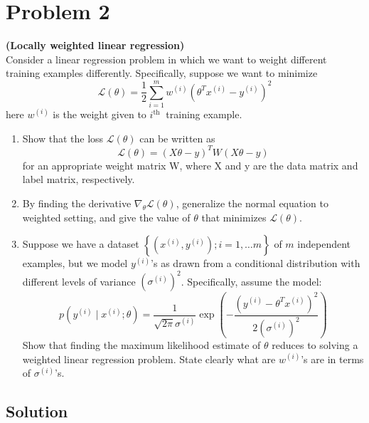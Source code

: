 \section*{Problem 2}

\textbf{(Locally weighted linear regression)}\\
Consider a linear regression problem in which we want to weight different training examples differently.
Specifically, suppose we want to minimize
\begin{equation*}
    \mathcal{L}(\theta)=\frac{1}{2} \sum_{i=1}^{m} w^{(i)}{\left(\theta^{T} x^{(i)}-y^{(i)}\right)}^{2}
\end{equation*}
here \( w^{(i)} \) is the weight given to \( i^{\text {th }} \) training example.

\begin{enumerate}[label= (\alph*), noitemsep, topsep=0pt]
    \item Show that the loss \( \mathcal{L}(\theta) \) can be written as
          \[
              \mathcal{L}(\theta)=(X \theta-y)^{T} W(X \theta-y)
          \]
          for an appropriate weight matrix W, where X and y are the data matrix and label matrix, respectively.

    \item  By finding the derivative \( \nabla_{\theta} \mathcal{L}(\theta) \), generalize the normal equation to weighted setting, and give the value of \( \theta \) that minimizes \( \mathcal{L}(\theta) \).

    \item  Suppose we have a dataset \( \left \{ \left(x^{(i)}, y^{(i)}\right) ; i=1, \ldots m\right \} \) of \( m \) independent examples, but we model \( y^{(i)} \)'s as drawn from a conditional distribution with different levels of variance \( {\left(\sigma^{(i)}\right)}^{2} \). Specifically, assume the model:
          \[
              p\left(y^{(i)} \mid x^{(i)} ; \theta\right)=\frac{1}{\sqrt{2 \pi} \sigma^{(i)}} \exp \left(-\frac{{\left(y^{(i)}-\theta^{T} x^{(i)}\right)}^{2}}{2{\left(\sigma^{(i)}\right)}^{2}}\right)
          \]
          Show that finding the maximum likelihood estimate of \( \theta \) reduces to solving a weighted linear regression problem. State clearly what are \( w^{(i)} \)'s are in terms of \( \sigma^{(i)} \)'s.
\end{enumerate}

\subsection*{Solution}

